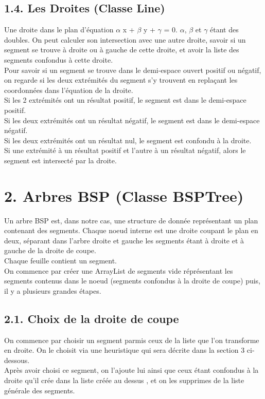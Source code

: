 \documentclass[a4paper,12pt]{report}	%
\begin{document}
    {\subsection*{1.4. Les Droites (Classe Line)}}
      Une droite dans le plan d'équation $\alpha$ x + $\beta$ y + $\gamma$  = 0.  $\alpha$, $\beta$ et $\gamma$ étant des doubles. On peut calculer son intersection avec une autre droite, savoir si un
    segment se trouve à droite ou à gauche de cette droite, et avoir la liste des segments confondus à cette droite.\\
    Pour savoir si un segment se trouve dans le demi-espace ouvert positif ou négatif, on regarde si les deux extrémités du segment s'y trouvent
    en replaçant les coordonnées dans l'équation de la droite. \\Si les 2 extrémités ont un résultat positif, le segment est dans le demi-espace positif.\\
    Si les deux extrémités ont un résultat négatif, le segment est dans le demi-espace négatif.\\ Si les deux extrémités ont un résultat nul,
    le segment est confondu à la droite. \\ Si une extrémité à un résultat positif et l'autre à un résultat négatif, alors le segment est intersecté par la
    droite. \\
	
\newpage

	{\section*{2. Arbres BSP (Classe BSPTree)}}
	  Un arbre BSP est, dans notre cas, une structure de donnée représentant un plan contenant des segments. Chaque noeud interne est une droite
    coupant le plan en deux, séparant dans l'arbre droite et gauche les segments étant à droite et à gauche de la droite de coupe.\\
    Chaque feuille contient un segment.\\
    On commence par créer une ArrayList de segments vide réprésentant les segments contenus dans le noeud (segments confondus à la droite de coupe) puis, il y a plusieurs grandes étapes.\\

    {\subsection*{2.1. Choix de la droite de coupe}}
      On commence par choisir un segment parmis ceux de la liste que l'on transforme en droite. On le choisit via une heuristique qui sera décrite dans la section 3 ci-dessous.\\
      Après avoir choisi ce segment, on l'ajoute lui ainsi que ceux étant confondus à la droite qu'il crée dans la liste créée au dessus , et on les supprimes de la liste générale des segments.\\
    
\end{document}
